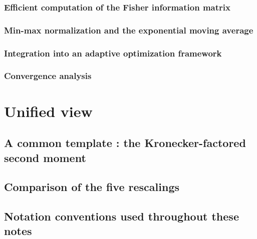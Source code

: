 \documentclass[11pt]{report}
\numberwithin{equation}{chapter}
\theoremstyle{plain}
\theoremstyle{remark}
\begin{document}
\subsection{Efficient computation of the Fisher information matrix}
\mbox{}\par

\subsection{Min-max normalization and the exponential moving average}
\mbox{}\par

\subsection{Integration into an adaptive optimization framework}
\mbox{}\par

\subsection{Convergence analysis}
\mbox{}\par

\chapter{Unified view}
\section{A common template : the Kronecker-factored second moment}
\mbox{}\par

\section{Comparison of the five rescalings}
\mbox{}\par

\section{Notation conventions used throughout these notes}
\mbox{}\par

\nocite{*}


\end{document}

